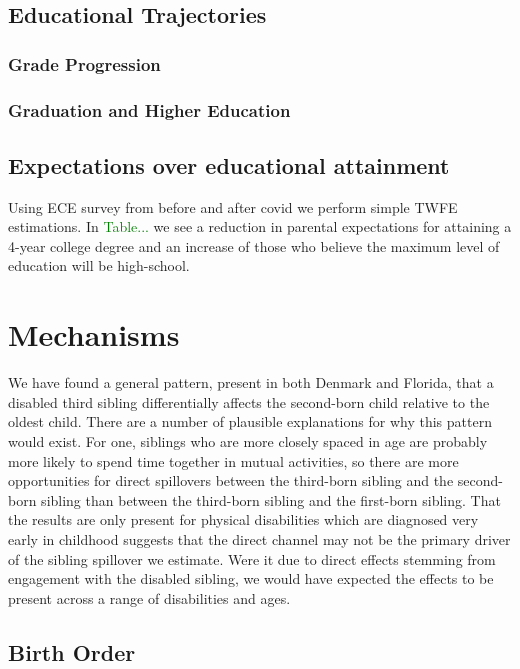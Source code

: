 \subsection{Educational Trajectories}

\subsubsection{Grade Progression}

\subsubsection{Graduation and Higher Education}

\subsection{Expectations over educational attainment}

Using ECE survey from before and after covid we perform simple TWFE estimations. In \textcolor{green}{Table...} we see a reduction in parental expectations for attaining a 4-year college degree and an increase of those who believe the maximum level of education will be high-school.


\section{Mechanisms}\label{sec:mechanisms}

We have found a general pattern, present in both Denmark and Florida, that a disabled third sibling differentially affects the second-born child relative to the oldest child. There are a number of plausible explanations for why this pattern would exist. For one, siblings who are more closely spaced in age are probably more likely to spend time together in mutual activities, so there are more opportunities for direct spillovers between the third-born sibling and the second-born sibling than between the third-born sibling and the first-born sibling. That the results are only present for physical disabilities which are diagnosed very early in childhood suggests that the direct channel may not be the primary driver of the sibling spillover we estimate. Were it due to direct effects stemming from engagement with the disabled sibling, we would have expected the effects to be present across a range of disabilities and ages.

\subsection{Birth Order}

